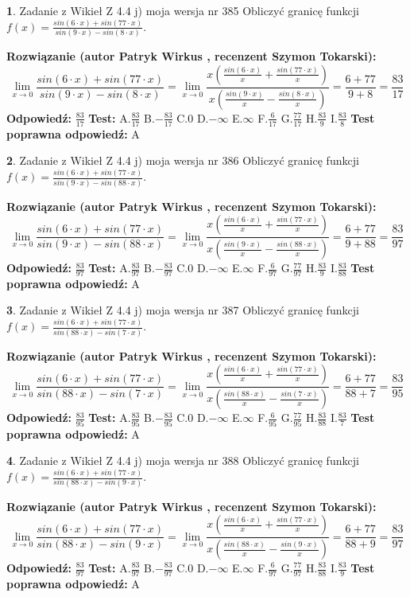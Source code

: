 \documentclass[12pt, a4paper]{article}
\theoremstyle{definition} %
\newtheorem{zad}{}
\newcommand{\zadStart}[1]{\begin{zad}#1\newline}
\newcommand{\zadStop}{\end{zad}}
\newcommand{\rozwStart}[2]{\noindent \textbf{Rozwiązanie (autor #1 , recenzent #2): }\newline}
\newcommand{\rozwStop}{\newline}
\newcommand{\odpStart}{\noindent \textbf{Odpowiedź:}\newline}
\newcommand{\odpStop}{\newline}
\newcommand{\testStart}{\noindent \textbf{Test:}\newline}
\newcommand{\testStop}{\newline}
\newcommand{\kluczStart}{\noindent \textbf{Test poprawna odpowiedź:}\newline}
\newcommand{\kluczStop}{\newline}
\begin{document}
\zadStart{Zadanie z Wikieł Z 4.4 j) moja wersja nr 385}
Obliczyć granicę funkcji $f(x)=\frac{sin(6\cdot x) +sin(77\cdot x)}{sin(9\cdot x) -sin(8\cdot x)}$.
\zadStop
\rozwStart{Patryk Wirkus}{Szymon Tokarski}
$$\lim\limits_{x\to 0}\frac{sin(6\cdot x) +sin(77\cdot x)}{sin(9\cdot x) -sin(8\cdot x)}=\lim\limits_{x\to 0}\frac{x(\frac{sin(6\cdot x)}{x}+\frac{sin(77\cdot x)}{x})}{x(\frac{sin(9\cdot x)}{x}-\frac{sin(8\cdot x)}{x})}=\frac{6+77}{9+8} = \frac{83}{17}$$
\rozwStop
\odpStart
$\frac{83}{17}$
\odpStop
\testStart
A.$\frac{83}{17}$
B.$-\frac{83}{17}$
C.$0$
D.$-\infty$
E.$\infty$
F.$\frac{6}{17}$
G.$\frac{77}{17}$
H.$\frac{83}{9}$
I.$\frac{83}{8}$
\testStop
\kluczStart
A
\kluczStop



\zadStart{Zadanie z Wikieł Z 4.4 j) moja wersja nr 386}
Obliczyć granicę funkcji $f(x)=\frac{sin(6\cdot x) +sin(77\cdot x)}{sin(9\cdot x) -sin(88\cdot x)}$.
\zadStop
\rozwStart{Patryk Wirkus}{Szymon Tokarski}
$$\lim\limits_{x\to 0}\frac{sin(6\cdot x) +sin(77\cdot x)}{sin(9\cdot x) -sin(88\cdot x)}=\lim\limits_{x\to 0}\frac{x(\frac{sin(6\cdot x)}{x}+\frac{sin(77\cdot x)}{x})}{x(\frac{sin(9\cdot x)}{x}-\frac{sin(88\cdot x)}{x})}=\frac{6+77}{9+88} = \frac{83}{97}$$
\rozwStop
\odpStart
$\frac{83}{97}$
\odpStop
\testStart
A.$\frac{83}{97}$
B.$-\frac{83}{97}$
C.$0$
D.$-\infty$
E.$\infty$
F.$\frac{6}{97}$
G.$\frac{77}{97}$
H.$\frac{83}{9}$
I.$\frac{83}{88}$
\testStop
\kluczStart
A
\kluczStop



\zadStart{Zadanie z Wikieł Z 4.4 j) moja wersja nr 387}
Obliczyć granicę funkcji $f(x)=\frac{sin(6\cdot x) +sin(77\cdot x)}{sin(88\cdot x) -sin(7\cdot x)}$.
\zadStop
\rozwStart{Patryk Wirkus}{Szymon Tokarski}
$$\lim\limits_{x\to 0}\frac{sin(6\cdot x) +sin(77\cdot x)}{sin(88\cdot x) -sin(7\cdot x)}=\lim\limits_{x\to 0}\frac{x(\frac{sin(6\cdot x)}{x}+\frac{sin(77\cdot x)}{x})}{x(\frac{sin(88\cdot x)}{x}-\frac{sin(7\cdot x)}{x})}=\frac{6+77}{88+7} = \frac{83}{95}$$
\rozwStop
\odpStart
$\frac{83}{95}$
\odpStop
\testStart
A.$\frac{83}{95}$
B.$-\frac{83}{95}$
C.$0$
D.$-\infty$
E.$\infty$
F.$\frac{6}{95}$
G.$\frac{77}{95}$
H.$\frac{83}{88}$
I.$\frac{83}{7}$
\testStop
\kluczStart
A
\kluczStop



\zadStart{Zadanie z Wikieł Z 4.4 j) moja wersja nr 388}
Obliczyć granicę funkcji $f(x)=\frac{sin(6\cdot x) +sin(77\cdot x)}{sin(88\cdot x) -sin(9\cdot x)}$.
\zadStop
\rozwStart{Patryk Wirkus}{Szymon Tokarski}
$$\lim\limits_{x\to 0}\frac{sin(6\cdot x) +sin(77\cdot x)}{sin(88\cdot x) -sin(9\cdot x)}=\lim\limits_{x\to 0}\frac{x(\frac{sin(6\cdot x)}{x}+\frac{sin(77\cdot x)}{x})}{x(\frac{sin(88\cdot x)}{x}-\frac{sin(9\cdot x)}{x})}=\frac{6+77}{88+9} = \frac{83}{97}$$
\rozwStop
\odpStart
$\frac{83}{97}$
\odpStop
\testStart
A.$\frac{83}{97}$
B.$-\frac{83}{97}$
C.$0$
D.$-\infty$
E.$\infty$
F.$\frac{6}{97}$
G.$\frac{77}{97}$
H.$\frac{83}{88}$
I.$\frac{83}{9}$
\testStop
\kluczStart
A
\kluczStop
\end{document}

